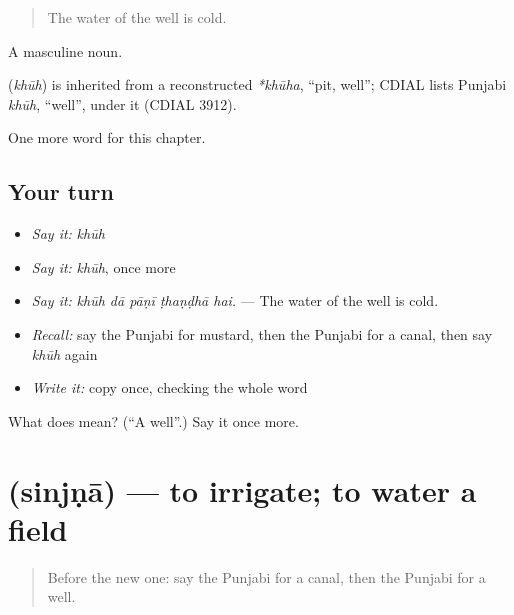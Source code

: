 \begin{quote}
The water of the well is cold.
\end{quote}

A masculine noun.

\begin{cousinweb}
\textbf{} (\emph{khūh}) is inherited from a reconstructed \emph{*khūha}, \textquotedblleft{}pit, well\textquotedblright{}; CDIAL lists Punjabi \emph{khūh}, \textquotedblleft{}well\textquotedblright{}, under it (CDIAL 3912).
\end{cousinweb}

\begin{grammarlens}[title={What you've built}]
One more word for this chapter.
\end{grammarlens}

\subsection*{Your turn}
\begin{itemize}
\raggedright
  \item \emph{Say it:} \emph{khūh}
  \item \emph{Say it:} \emph{khūh}, once more
  \item \emph{Say it:} \emph{khūh dā pāṇī ṭhaṇḍhā hai.} — The water of the well is cold.
  \item \emph{Recall:} say the Punjabi for mustard, then the Punjabi for a canal, then say \emph{khūh} again
  \item \emph{Write it:} copy \textbf{} once, checking the whole word
\end{itemize}

\begin{tcolorbox}[breakable,colback=teal!4,colframe=teal!35!black,title={Before you move on}]
What does  mean? (\textquotedblleft{}A well\textquotedblright{}.) Say it once more.
\end{tcolorbox}
\section[\texorpdfstring{\pa{ਸਿੰਜਣਾ} (sinjṇā)}{ਸਿੰਜਣਾ (sinjṇā)}]{ (sinjṇā) — to irrigate; to water a field}

\label{lesson:PA-C303-sinjna}



\begin{quote}
Before the new one: say the Punjabi for a canal, then the Punjabi for a well.
\end{quote}

